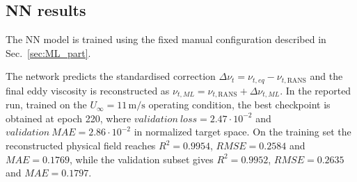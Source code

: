 \subsection{NN results}
\label{sec:NN_results}
The NN model is trained using the fixed manual configuration described in Sec.~\ref{sec:ML_part}.

The network predicts the standardised correction $\Delta \nu_t=\nu_{t,eq}-\nu_{t,\mathrm{RANS}}$ and the final eddy viscosity is reconstructed as $\nu_{t,ML}=\nu_{t,\mathrm{RANS}}+\Delta \nu_{t,ML}$. In the reported run, trained on the $U_\infty=11\,\mathrm{m/s}$ operating condition, the best checkpoint is obtained at epoch 220, where $validation\ loss=2.47\cdot10^{-2}$ and $validation\ MAE=2.86\cdot10^{-2}$ in normalized target space. On the training set the reconstructed physical field reaches $R^2=0.9954$, $RMSE=0.2584$ and $MAE=0.1769$, while the validation subset gives $R^2=0.9952$, $RMSE=0.2635$ and $MAE=0.1797$.


